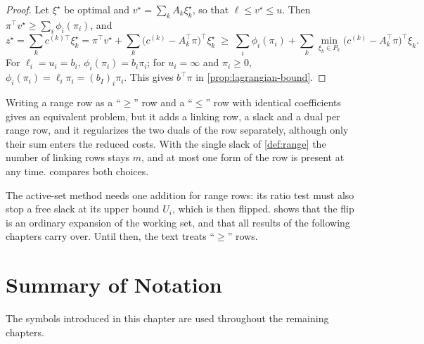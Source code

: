 \begin{proof}
Let $\xi^\star$ be optimal and $v^\star = \sum_kA_k\xi_k^\star$, so that
$\ell\le v^\star\le u$. Then $\pi^\top v^\star\ge\sum_i\phi_i(\pi_i)$, and
\[
z^\star = \sum_k c^{(k)\top}\xi_k^\star
= \pi^\top v^\star + \sum_k\bigl(c^{(k)} - A_k^\top\pi\bigr)^\top\xi_k^\star
\;\ge\; \sum_i\phi_i(\pi_i) + \sum_k\min_{\xi_k\in P_k}\bigl(c^{(k)} - A_k^\top\pi\bigr)^\top\xi_k .
\]
For $\ell_i = u_i = b_i$, $\phi_i(\pi_i) = b_i\pi_i$; for $u_i = \infty$ and $\pi_i\ge0$,
$\phi_i(\pi_i) = \ell_i\pi_i = (b_I)_i\pi_i$. This gives $b^\top\pi$ in
\cref{prop:lagrangian-bound}.
\end{proof}

\begin{remark} \label{rem:range-split}
Writing a range row as a ``$\ge$'' row and a ``$\le$'' row with identical coefficients gives
an equivalent problem, but it adds a linking row, a slack and a dual per range row, and it
regularizes the two duals of the row separately, although only their sum enters the reduced
costs. With the single slack of \cref{def:range} the number of linking rows stays $m$, and at
most one form of the row is present at any time.  compares both
choices.
\end{remark}

The active-set method needs one addition for range rows: its ratio test must also stop a
free slack at its upper bound $U_i$, which is then flipped.  shows that
the flip is an ordinary expansion of the working set, and that all results of the following
chapters carry over. Until then, the text treats ``$\ge$'' rows.


\needspace{0.5\textheight}
\section{Summary of Notation}

The symbols introduced in this chapter are used throughout the remaining chapters.

